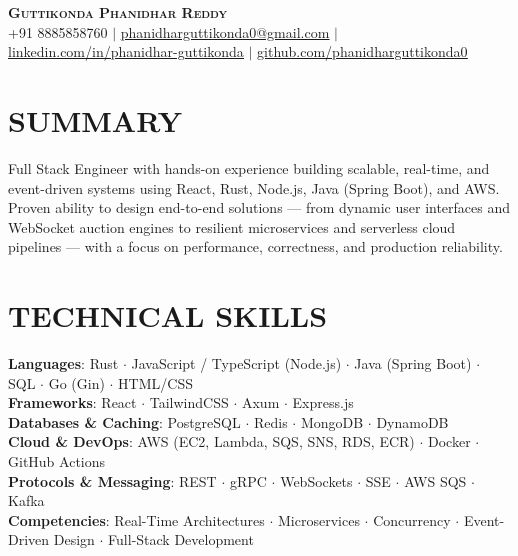 \documentclass[letterpaper,11pt]{article}
\begin{document}
\begin{center}
    \textbf{\Huge \scshape Guttikonda Phanidhar Reddy} \\ \vspace{1pt}
    \small +91 8885858760 $|$ \href{mailto:phanidharguttikonda0@gmail.com}{\underline{phanidharguttikonda0@gmail.com}} $|$ 
    \href{https://linkedin.com/in/phanidhar-guttikonda}{\underline{linkedin.com/in/phanidhar-guttikonda}} $|$
    \href{https://github.com/phanidharguttikonda0}{\underline{github.com/phanidharguttikonda0}}
\end{center}

\section{SUMMARY}
 \begin{itemize}[leftmargin=0.15in, label={}]
    \small{\item{
     {Full Stack Engineer with hands-on experience building scalable, real-time, and event-driven systems using React, Rust, Node.js, Java (Spring Boot), and AWS. Proven ability to design end-to-end solutions --- from dynamic user interfaces and WebSocket auction engines to resilient microservices and serverless cloud pipelines --- with a focus on performance, correctness, and production reliability.}
    }}
 \end{itemize}
\vspace{-12pt}

\section{TECHNICAL SKILLS}
 \begin{itemize}[leftmargin=0.15in, label={}]
    \small{\item{
     \textbf{Languages}{: Rust $\cdot$ JavaScript / TypeScript (Node.js) $\cdot$ Java (Spring Boot) $\cdot$ SQL $\cdot$ Go (Gin) $\cdot$ HTML/CSS} \\
     \textbf{Frameworks}{: React $\cdot$ TailwindCSS $\cdot$ Axum $\cdot$ Express.js} \\
     \textbf{Databases \& Caching}{: PostgreSQL $\cdot$ Redis $\cdot$ MongoDB $\cdot$ DynamoDB} \\
     \textbf{Cloud \& DevOps}{: AWS (EC2, Lambda, SQS, SNS, RDS, ECR) $\cdot$ Docker $\cdot$ GitHub Actions} \\
     \textbf{Protocols \& Messaging}{: REST $\cdot$ gRPC $\cdot$ WebSockets $\cdot$ SSE $\cdot$ AWS SQS $\cdot$ Kafka} \\
     \textbf{Competencies}{: Real-Time Architectures $\cdot$ Microservices $\cdot$ Concurrency $\cdot$ Event-Driven Design $\cdot$ Full-Stack Development} \\
    }}
 \end{itemize}
 \vspace{-16pt}
\end{document}
